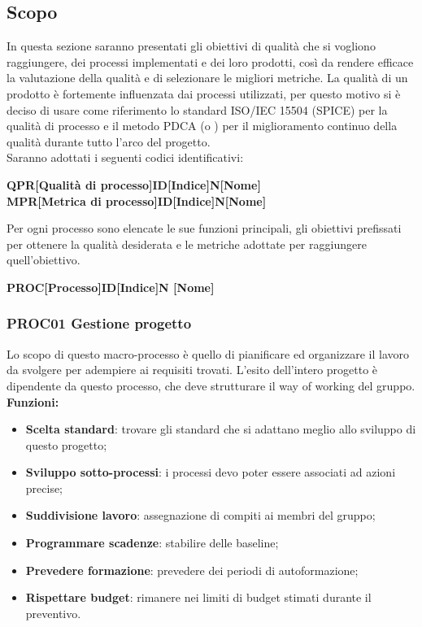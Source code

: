 \documentclass[../piano_di_qualifica.tex]{subfiles}
\begin{document}
\subsection{Scopo}
In questa sezione saranno presentati gli obiettivi di qualità che si vogliono raggiungere, dei processi implementati e dei loro prodotti, così da rendere efficace la valutazione della qualità e di selezionare le migliori metriche.
La qualità di un prodotto è fortemente influenzata dai processi utilizzati, per questo motivo si è deciso di usare come riferimento lo standard ISO/IEC 15504 (SPICE) per la qualità di processo e il metodo PDCA (o ) per il miglioramento continuo della qualità durante tutto l'arco del progetto.\\
Saranno adottati i seguenti codici identificativi:\par

\begin{center}
	\textbf{QPR[Qualità di processo]ID[Indice]N[Nome]}\\
	\textbf{MPR[Metrica di processo]ID[Indice]N[Nome]}
\end{center}

Per ogni processo sono elencate le sue funzioni principali, gli obiettivi prefissati per ottenere la qualità desiderata e le metriche adottate per raggiungere quell’obiettivo.

\begin{center}
	\textbf{PROC[Processo]ID[Indice]N [Nome]}
\end{center}

\subsubsection{PROC01 Gestione progetto}
Lo scopo di questo macro-processo è quello di pianificare ed organizzare il lavoro da svolgere per adempiere ai requisiti trovati. L'esito dell'intero progetto è dipendente da questo processo, che deve strutturare il way of working del gruppo. \\

\textbf{Funzioni:}
\smallbreak
\begin{itemize}
	\item \textbf{Scelta standard}: trovare gli standard che si adattano meglio allo sviluppo di questo progetto;
	\item \textbf{Sviluppo sotto-processi}: i processi devo poter essere associati ad azioni precise;
	\item \textbf{Suddivisione lavoro}: assegnazione di compiti ai membri del gruppo;
	\item \textbf{Programmare scadenze}: stabilire delle baseline;
	\item \textbf{Prevedere formazione}: prevedere dei periodi di autoformazione;
	\item \textbf{Rispettare budget}: rimanere nei limiti di budget stimati durante il preventivo.
\end{itemize}
\end{document}
